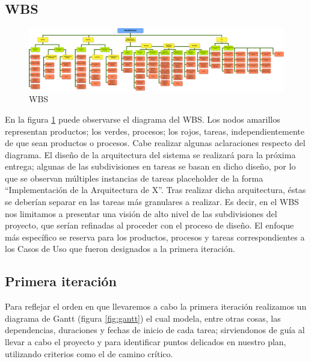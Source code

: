 \subsection{WBS}

\begin{figure}[H]
 \centering
  \includegraphics[width=\textwidth]{diagramas/WBS.pdf}
  \caption{WBS}
  \label{fig:wbs}
\end{figure}

En la figura \ref{fig:wbs} puede observarse el diagrama del WBS. Los nodos amarillos representan productos; los verdes, procesos; los rojos, tareas, independientemente de que sean productos o procesos.
Cabe realizar algunas aclaraciones respecto del diagrama. El diseño de la arquitectura del sistema se realizará para la próxima entrega; algunas de las subdivisiones en tareas se basan en dicho diseño, por lo que se observan múltiples instancias de tareas placeholder de la forma “Implementación de la Arquitectura de X”. Tras realizar dicha arquitectura, éstas se deberían separar en las tareas más granulares a realizar.
Es decir, en el WBS nos limitamos a presentar una visión de alto nivel de las subdivisiones del proyecto, que serían refinadas al proceder con el proceso de diseño. El enfoque más específico se reserva para los productos, procesos y tareas correspondientes a los Casos de Uso que fueron designados a la primera iteración.

\subsection{Primera iteración}
Para reflejar el orden en que llevaremos a cabo la primera iteración realizamos un diagrama de Gantt (figura \ref{fig:gantt}) el cual modela, entre otras cosas, las dependencias, duraciones y fechas de inicio de cada tarea; sirviendonos de guía al llevar a cabo el proyecto y para identificar puntos delicados en nuestro plan, utilizando criterios como el de camino crítico. 

